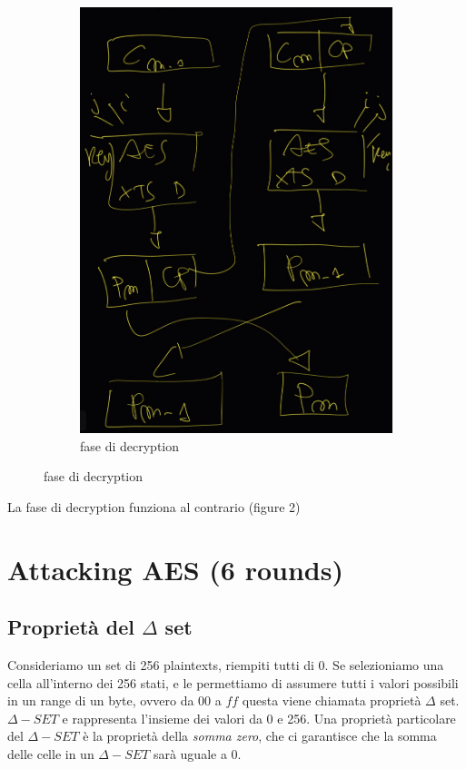 \documentclass[11pt, oneside]{article}   	%
\begin{document}
\begin{figure}[H]
\begin{subfigure}[h]{0.4\linewidth}
\includegraphics[width=\linewidth]{cpo-1}
\caption*{fase di decryption}
\end{subfigure}%
\end{figure}
La fase di decryption funziona al contrario (figure 2)


\section*{Attacking AES (6 rounds)}
\subsection*{Proprietà del $\Delta$ set}
Consideriamo un set di 256 plaintexts, riempiti tutti di 0. Se selezioniamo una cella all'interno dei 256 stati, e le permettiamo di assumere tutti i valori possibili in un range di un byte, ovvero da $00$ a $ff$ questa viene chiamata proprietà $\Delta$ set. $\Delta - SET$ e rappresenta l'insieme dei valori da 0 e 256. Una proprietà particolare del $\Delta - SET$ è la proprietà della \emph{somma zero}, che ci garantisce che la somma delle celle in un  $\Delta - SET$ sarà uguale a 0.\\
\end{document}
